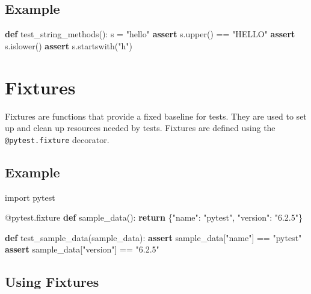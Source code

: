 \documentclass[
  letterpaper,
  DIV=11,
  numbers=noendperiod]{scrreprt}
\newenvironment{Shaded}{\begin{snugshade}}{\end{snugshade}}
\newcommand{\AttributeTok}[1]{\textcolor[rgb]{0.40,0.45,0.13}{#1}}
\newcommand{\ControlFlowTok}[1]{\textcolor[rgb]{0.00,0.23,0.31}{\textbf{#1}}}
\newcommand{\ImportTok}[1]{\textcolor[rgb]{0.00,0.46,0.62}{#1}}
\newcommand{\KeywordTok}[1]{\textcolor[rgb]{0.00,0.23,0.31}{\textbf{#1}}}
\newcommand{\NormalTok}[1]{\textcolor[rgb]{0.00,0.23,0.31}{#1}}
\newcommand{\OperatorTok}[1]{\textcolor[rgb]{0.37,0.37,0.37}{#1}}
\newcommand{\StringTok}[1]{\textcolor[rgb]{0.13,0.47,0.30}{#1}}
\begin{document}
\subsection{Example}\label{example-18}

\begin{Shaded}
\begin{Highlighting}[]
\KeywordTok{def}\NormalTok{ test\_string\_methods():}
\NormalTok{    s }\OperatorTok{=} \StringTok{"hello"}
    \ControlFlowTok{assert}\NormalTok{ s.upper() }\OperatorTok{==} \StringTok{"HELLO"}
    \ControlFlowTok{assert}\NormalTok{ s.islower()}
    \ControlFlowTok{assert}\NormalTok{ s.startswith(}\StringTok{"h"}\NormalTok{)}
\end{Highlighting}
\end{Shaded}

\section{Fixtures}\label{fixtures}

Fixtures are functions that provide a fixed baseline for tests. They are
used to set up and clean up resources needed by tests. Fixtures are
defined using the \texttt{@pytest.fixture} decorator.

\subsection{Example}\label{example-19}

\begin{Shaded}
\begin{Highlighting}[]
\ImportTok{import}\NormalTok{ pytest}

\AttributeTok{@pytest.fixture}
\KeywordTok{def}\NormalTok{ sample\_data():}
    \ControlFlowTok{return}\NormalTok{ \{}\StringTok{"name"}\NormalTok{: }\StringTok{"pytest"}\NormalTok{, }\StringTok{"version"}\NormalTok{: }\StringTok{"6.2.5"}\NormalTok{\}}

\KeywordTok{def}\NormalTok{ test\_sample\_data(sample\_data):}
    \ControlFlowTok{assert}\NormalTok{ sample\_data[}\StringTok{"name"}\NormalTok{] }\OperatorTok{==} \StringTok{"pytest"}
    \ControlFlowTok{assert}\NormalTok{ sample\_data[}\StringTok{"version"}\NormalTok{] }\OperatorTok{==} \StringTok{"6.2.5"}
\end{Highlighting}
\end{Shaded}

\subsection{Using Fixtures}\label{using-fixtures}
\end{document}
